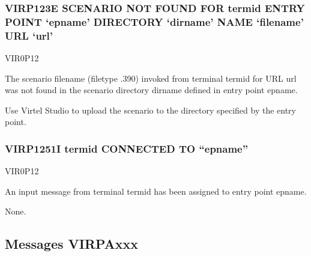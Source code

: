 \documentclass[letterpaper,10pt,english]{sphinxmanual}
\begin{document}
\subsubsection{VIRP123E SCENARIO NOT FOUND FOR termid ENTRY POINT ‘epname’ DIRECTORY ‘dirname’ NAME ‘filename’ URL ‘url’}
\label{\detokenize{messages:virp123e-scenario-not-found-for-termid-entry-point-epname-directory-dirname-name-filename-url-url}}\begin{description}
\sphinxAtStartPar
VIR0P12

\sphinxAtStartPar
The scenario filename (filetype .390) invoked from terminal termid for URL url was not found in the scenario directory dirname defined in entry point epname.

\sphinxAtStartPar
Use Virtel Studio to upload the scenario to the directory specified by the entry point.

\end{description}


\subsubsection{VIRP1251I termid CONNECTED TO “epname”}
\label{\detokenize{messages:virp1251i-termid-connected-to-epname}}\begin{description}
\sphinxAtStartPar
VIR0P12

\sphinxAtStartPar
An input message from terminal termid has been assigned to entry point epname.

\sphinxAtStartPar
None.

\end{description}


\subsection{Messages VIRPAxxx}
\label{\detokenize{messages:messages-virpaxxx}}
\end{document}
